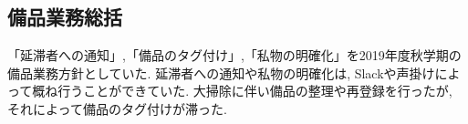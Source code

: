 \subsection*{備品業務総括}

「延滞者への通知」,「備品のタグ付け」,「私物の明確化」を2019年度秋学期の備品業務方針としていた.  延滞者への通知や私物の明確化は, Slackや声掛けによって概ね行うことができていた.  大掃除に伴い備品の整理や再登録を行ったが, それによって備品のタグ付けが滞った.

